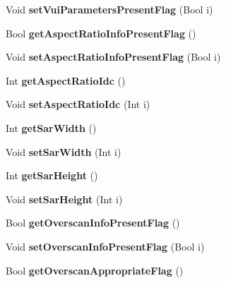 \begin{DoxyCompactItemize}
Void {\bfseries set\+Vui\+Parameters\+Present\+Flag} (Bool i)
\item 
\mbox{\label{class_t_enc_cfg_a8bc65bbde3119e6d29596db24aa10486}} 
Bool {\bfseries get\+Aspect\+Ratio\+Info\+Present\+Flag} ()
\item 
\mbox{\label{class_t_enc_cfg_ac4ca1b548b8126569b9e345c0bbee3fd}} 
Void {\bfseries set\+Aspect\+Ratio\+Info\+Present\+Flag} (Bool i)
\item 
\mbox{\label{class_t_enc_cfg_a56cedd5ef6ed886512983a6a02309c20}} 
Int {\bfseries get\+Aspect\+Ratio\+Idc} ()
\item 
\mbox{\label{class_t_enc_cfg_a752f1fa3da1f492831ade49a094bc070}} 
Void {\bfseries set\+Aspect\+Ratio\+Idc} (Int i)
\item 
\mbox{\label{class_t_enc_cfg_a403f0d23fa12f1f47e861c89a8f16a54}} 
Int {\bfseries get\+Sar\+Width} ()
\item 
\mbox{\label{class_t_enc_cfg_a24eb2c2efaccaef49b7ef9837c5fb0f5}} 
Void {\bfseries set\+Sar\+Width} (Int i)
\item 
\mbox{\label{class_t_enc_cfg_a5aa818037595995ea92dce798af18b16}} 
Int {\bfseries get\+Sar\+Height} ()
\item 
\mbox{\label{class_t_enc_cfg_a69b62fffb5695588ea2ed39262814e2a}} 
Void {\bfseries set\+Sar\+Height} (Int i)
\item 
\mbox{\label{class_t_enc_cfg_a61822a68f2f2eaff1e1fb9e8f7185d77}} 
Bool {\bfseries get\+Overscan\+Info\+Present\+Flag} ()
\item 
\mbox{\label{class_t_enc_cfg_acaf3bfc93571bfcd95cef4ad969c3c06}} 
Void {\bfseries set\+Overscan\+Info\+Present\+Flag} (Bool i)
\item 
\mbox{\label{class_t_enc_cfg_abcafa555abb1fbaf93760c44963f0c24}} 
Bool {\bfseries get\+Overscan\+Appropriate\+Flag} ()
\item 
\mbox{\label{class_t_enc_cfg_a578190766397d1796c0d471dac4c3738}} 

\end{DoxyCompactItemize}
